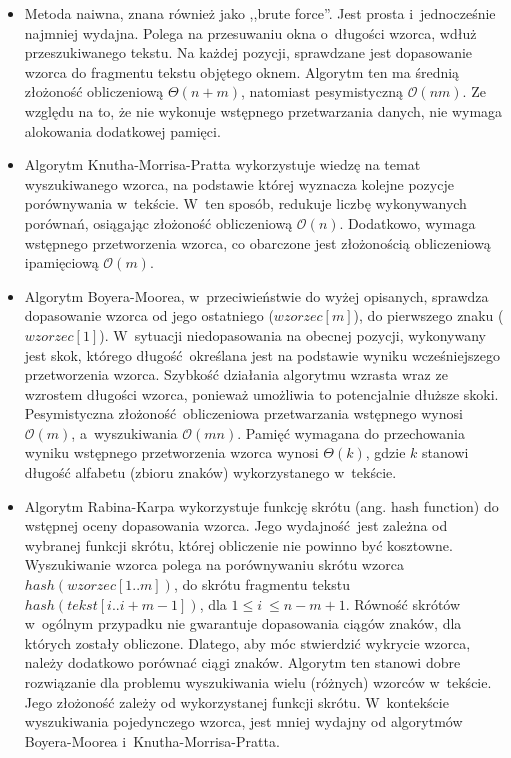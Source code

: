 \begin{itemize}
    \item Metoda naiwna, znana również jako ,,brute force''. Jest prosta i~jednocześnie najmniej wydajna. Polega na przesuwaniu okna o~długości wzorca, wdłuż przeszukiwanego tekstu. Na każdej pozycji, sprawdzane jest dopasowanie wzorca do fragmentu tekstu objętego oknem\cite{NaiveSearchAlgo}. Algorytm ten ma średnią złożoność obliczeniową $\Theta(n+m)$, natomiast pesymistyczną $\mathcal{O}(nm)$. Ze względu na to, że nie wykonuje wstępnego przetwarzania danych, nie wymaga alokowania dodatkowej pamięci.
    \item Algorytm Knutha-Morrisa-Pratta wykorzystuje wiedzę na temat wyszukiwanego wzorca, na podstawie której wyznacza kolejne pozycje porównywania w~tekście\cite{KnuthMorrisPrattAlgo}. W~ten sposób, redukuje liczbę wykonywanych porównań, osiągając złożoność obliczeniową $\mathcal{O}(n)$. Dodatkowo, wymaga wstępnego przetworzenia wzorca, co obarczone jest złożonością obliczeniową i\linebreak pamięciową $\mathcal{O}(m)$.
    \item Algorytm Boyera-Moorea, w~przeciwieństwie do wyżej opisanych, sprawdza dopasowanie wzorca od jego ostatniego ($wzorzec[m]$), do pierwszego znaku ($wzorzec[1]$). W~sytuacji niedopasowania na obecnej pozycji, wykonywany jest skok, którego długość określana jest na podstawie wyniku wcześniejszego przetworzenia wzorca\cite{BoyerMooreAlgo}. Szybkość działania algorytmu wzrasta wraz ze wzrostem długości wzorca, ponieważ umożliwia to potencjalnie dłuższe skoki. Pesymistyczna złożoność obliczeniowa przetwarzania wstępnego wynosi $\mathcal{O}(m)$, a~wyszukiwania $\mathcal{O}(mn)$. Pamięć wymagana do przechowania wyniku wstępnego przetworzenia wzorca wynosi $\Theta(k)$, gdzie $k$ stanowi długość alfabetu (zbioru znaków) wykorzystanego w~tekście.
    \item Algorytm Rabina-Karpa wykorzystuje funkcję skrótu (ang. hash function) do wstępnej oceny dopasowania wzorca\cite{RabinKarpAlgo}. Jego wydajność jest zależna od wybranej funkcji skrótu, której obliczenie nie powinno być kosztowne. Wyszukiwanie wzorca polega na porównywaniu skrótu wzorca $hash(wzorzec[1..m])$, do skrótu fragmentu tekstu $hash(tekst[i..i+m-1])$, dla $1 \leq i~\leq n-m+1$. Równość skrótów w~ogólnym przypadku nie gwarantuje dopasowania ciągów znaków, dla których zostały obliczone. Dlatego, aby móc stwierdzić wykrycie wzorca, należy dodatkowo porównać ciągi znaków.
    Algorytm ten stanowi dobre rozwiązanie dla problemu wyszukiwania wielu (różnych) wzorców w~tekście. Jego złożoność zależy od wykorzystanej funkcji skrótu. W~kontekście wyszukiwania pojedynczego wzorca, jest mniej wydajny od algorytmów Boyera-Moorea i~Knutha-Morrisa-Pratta. 

\end{itemize}
